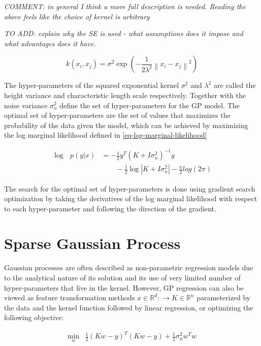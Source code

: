 \documentclass[useAMS,usenatbib,fleqn]{mn2e}
\begin{document}
\textit{COMMENT: in general I think a more full description is needed. Reading the above feels like the choice of kernel is arbitrary}

\textit{TO ADD: explain why the SE is used - what assumptions does it impose and what advantages does it have.}

\begin{equation}
\label{eq-squared-exponential}
k(x_{i},x_{j}) = \sigma^{2} \exp \left ( -\frac{1} {2\lambda^{2}} \left \|x_{i}-x_{j}\right\|^{2}\right )
\end{equation}

The hyper-parameters of the squared exponential kernel $\sigma^{2}$ and $\lambda^{2}$ are called the height variance and characteristic length scale respectively. Together with the noise variance $\sigma_{n}^{2}$ define the set of hyper-parameters for the GP model. The optimal set of hyper-parameters are the set of values that maximizes the probability of the data given the model, which can be achieved by maximizing the log marginal likelihood defined in \eqref{eq-log-marginal-likelihood} 

\begin{align}
\label{eq-log-marginal-likelihood}
\log\text{ }p(y|x) &= -\frac{1}{2}y^{T}\left(K+I\sigma_{n}^{2} \right)^{-1}y \nonumber \\
&\qquad -\frac{1}{2} \log\left | K+I\sigma_{n}^{2}\right|-\frac{n}{2}log(2\pi)
\end{align}

The search for the optimal set of hyper-parameters is done using gradient search optimization by taking the derivatives of the log marginal likelihood with respect to each hyper-parameter and following the direction of the gradient.

\section{Sparse Gaussian Process}
\label{sec-sparse-gaussian-process}
Gaussian processes are often described as non-parametric regression models due to the analytical nature of its solution and its use of very limited number of hyper-parameters that live in the kernel. However, GP regression can also be viewed as feature transformation methods $x\in \mathbb{R}^{d}:\rightarrow K\in \mathbb{R}^{n}$ parameterized by the data and the kernel function followed by linear regression, or optimizing the following objective:

\begin{equation}
\label{eq-linear-regression-objective}
\begin{array}{lcl}
\underset{w}{\text{min}} &\frac{1}{2}\left ( Kw-y \right )^{T}\left( Kw-y \right )+\frac{1}{2}\sigma_{n}^{2}w^{T}w
\end{array}
\end{equation}
\end{document}
